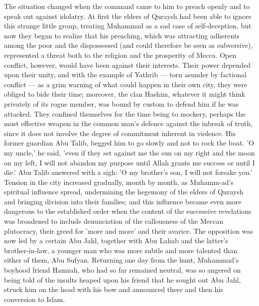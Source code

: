 \documentclass[10pt, twoside]{book}
\begin{document}
The situation changed when the command came to him to preach openly and to speak out against 
idolatry. At first the elders of Quraysh had been able to ignore this strange little group, treating 
Muhammad as a sad case of self\hyp{}deception, but now they began to realize that his preaching, which was 
attracting adherents among the poor and the dispossessed (and could therefore be seen as subversive), 
represented a threat both to the religion and the prosperity of Mecca. Open conflict, however, would 
have been against their interests. Their power depended upon their unity, and with the example of 
Yathrib --- torn asunder by factional conflict --- as a grim warning of what could happen in their own 
city, they were obliged to bide their time; moreover, the clan Hashim, whatever it might think 
privately of its rogue member, was bound by custom to defend him if he was attacked. They confined 
themselves for the time being to mockery, perhaps the most effective weapon in the common man's 
defence against the inbreak of truth, since it does not involve the degree of commitment inherent in 
violence. His former guardian Abu Talib, begged him to go slowly and not to rock the boat. 'O my 
uncle,' he said, 'even if they set against me the sun on my right and the moon on my left, I will not 
abandon my purpose until Allah grants me success or until I die.' Abu Talib answered with a sigh: 'O 
my brother's son, I will not forsake you.' \\

Tension in the city increased gradually, month by month, as Muhamm\hyp{}ad's spiritual influence spread, 
undermining the hegemony of the elders of Quraysh and bringing division into their families; and this 
influence became even more dangerous to the established order when the content of the successive 
revelations was broadened to include denunciation of the callousness of the Meccan plutocracy, their 
greed for 'more and more' and their avarice. The opposition was now led by a certain Abu Jahl, 
together with Abu Lahab and the latter's brother\hyp{}in\hyp{}law, a younger man who was more subtle and more 
talented than either of them, Abu Sufyan. Returning one day from the hunt, Muhammad's boyhood friend 
Hamzah, who had so far remained neutral, was so angered on being told of the insults heaped upon his 
friend that he sought out Abu Jahl, struck him on the head with his bow and announced there and then 
his conversion to Islam. \\
\end{document}
